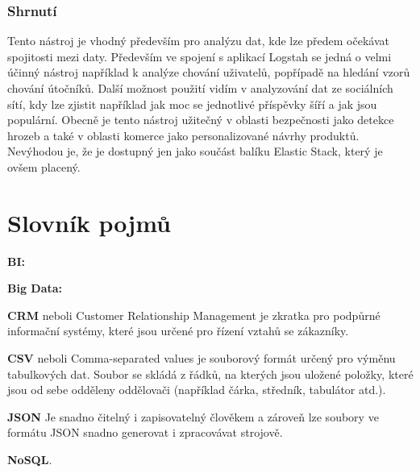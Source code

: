 \documentclass[czech,BP]{thesiskiv}
\begin{document}
\subsection{Shrnutí}
Tento nástroj je vhodný především pro analýzu dat, kde lze předem očekávat spojitosti mezi daty. Především ve spojení s aplikací Logstah se jedná o velmi účinný nástroj například k analýze chování uživatelů, popřípadě na hledání vzorů chování útočníků. Další možnost použití vidím v analyzování dat ze sociálních sítí, kdy lze zjistit například jak moc se jednotlivé příspěvky šíří a jak jsou populární. Obecně je tento nástroj užitečný v oblasti bezpečnosti jako detekce hrozeb a také v oblasti komerce jako personalizované návrhy produktů. Nevýhodou je, že je dostupný jen jako součást balíku Elastic Stack, který je ovšem placený.
% 
%
\chapter{Slovník pojmů}



\hspace{0,5cm} \textbf{BI:}  \cite{BI}

\textbf{Big Data:}  \cite{BigData}

\textbf{CRM} neboli Customer Relationship Management je zkratka pro podpůrné informační systémy, které jsou určené pro řízení vztahů se zákazníky.

\textbf{CSV} neboli Comma-separated values je souborový formát určený pro výměnu tabulkových dat. Soubor se skládá z řádků, na kterých jsou uložené položky, které jsou od sebe odděleny oddělovači (například čárka, středník, tabulátor atd.).

\textbf{JSON}  Je snadno čitelný i zapisovatelný člověkem a zároveň lze soubory ve formátu JSON snadno generovat i zpracovávat strojově.\cite{JSON}

\textbf{NoSQL}.\cite{NoSQL}
\end{document}
